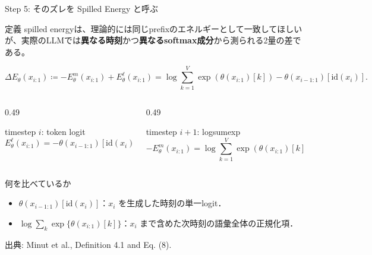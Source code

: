 \documentclass[dvipdfmx,uplatex,unicode,9pt,aspectratio=169]{beamer}
\newcommand{\source}[1]{\vfill{\tiny\color{GrayText}出典: #1}}
\newcommand{\DeltaE}{\Delta E_{\theta}}
\newcommand{\El}{E^{\ell}_{\theta}}
\newcommand{\Em}{E^{m}_{\theta}}
\begin{document}
\begin{frame}{Step 5: そのズレを Spilled Energy と呼ぶ}
\begin{block}{定義}
spilled energyは、理論的には同じprefixのエネルギーとして一致してほしいが、実際のLLMでは\textbf{異なる時刻}かつ\textbf{異なるsoftmax成分}から測られる2量の差である。
\end{block}
\vspace{-0.2em}
\begin{equation}
 \DeltaE(x_{i:1}) \coloneqq -\Em(x_{i:1})+\El(x_{i:1})
= \log\sum_{k=1}^{V}\exp(\theta(x_{i:1})[k]) - \theta(x_{i-1:1})[\mathrm{id}(x_i)].
\end{equation}
\vspace{-0.5em}
\begin{columns}[T,onlytextwidth]
\begin{column}{0.49\linewidth}
\begin{block}{timestep $i$: token logit}
\[
\El(x_{i:1})
= -\theta(x_{i-1:1})[\mathrm{id}(x_i)].
\]
\end{block}
\end{column}
\begin{column}{0.49\linewidth}
\begin{block}{timestep $i+1$: logsumexp}
\[
-\Em(x_{i:1})
=\log\sum_{k=1}^{V}\exp(\theta(x_{i:1})[k]).
\]
\end{block}
\end{column}
\end{columns}
\begin{block}{何を比べているか}
\begin{itemize}
\item $\theta(x_{i-1:1})[\mathrm{id}(x_i)]$：$x_i$ を生成した時刻の単一logit．
\item $\log\sum_k\exp\{\theta(x_{i:1})[k]\}$：$x_i$ まで含めた次時刻の語彙全体の正規化項．
\end{itemize}
\end{block}
\source{Minut et al., Definition 4.1 and Eq. (8).}
\end{frame}
\end{document}
